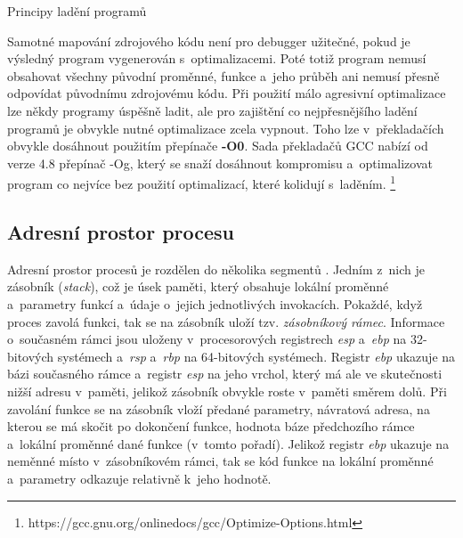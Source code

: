 \documentclass[czech,bachelor,male,python,dept460,hidelinks]{diploma}						%
\newcommand{\parspace}[1][]{
	\ifthenelse{\isempty{#1}}{\vspace{0mm}}{\vspace{#1}}
	\par
}
\begin{document}
\begin{section}{Principy ladění programů}
		\parspace Samotné mapování zdrojového kódu není pro debugger užitečné, pokud je výsledný program vygenerován s~optimalizacemi. Poté
		totiž program nemusí obsahovat všechny původní proměnné, funkce a~jeho průběh ani nemusí přesně odpovídat původnímu zdrojovému kódu.
		Při použití málo agresivní optimalizace lze někdy programy úspěšně ladit, ale pro zajištění co nejpřesnějšího ladění programů je obvykle nutné
		optimalizace zcela vypnout. Toho lze v~překladačích obvykle dosáhnout použitím přepínače \textbf{-O0}. Sada překladačů GCC nabízí od verze 4.8
		přepínač -Og, který se snaží dosáhnout kompromisu a~optimalizovat program co nejvíce bez použití optimalizací, které kolidují s~laděním.
		\footnote{https://gcc.gnu.org/onlinedocs/gcc/Optimize-Options.html}
	
	\subsection{Adresní prostor procesu}
		Adresní prostor procesů je rozdělen do několika segmentů \cite[53]{tanenbaum}. Jedním z~nich je zásobník (\textit{stack}), což je úsek paměti, který
		obsahuje lokální proměnné a~parametry funkcí a~údaje o~jejich jednotlivých invokacích. Pokaždé, když proces zavolá funkci, tak se na zásobník uloží tzv.
		\textit{zásobníkový rámec}. Informace o~současném rámci jsou uloženy v~procesorových registrech \textit{esp} a~\textit{ebp} na 32-bitových systémech
		a~\textit{rsp} a~\textit{rbp} na 64-bitových systémech. Registr \textit{ebp} ukazuje na bázi současného rámce a~registr \textit{esp} na jeho vrchol, který
		má ale ve skutečnosti nižší adresu v~paměti, jelikož zásobník obvykle roste v~paměti směrem dolů. Při zavolání funkce se na zásobník vloží předané parametry,
		návratová adresa, na kterou se má skočit po dokončení funkce, hodnota báze předchozího rámce a~lokální proměnné dané funkce (v~tomto pořadí).
		Jelikož registr \textit{ebp} ukazuje na neměnné místo v~zásobníkovém rámci, tak se kód funkce na lokální proměnné a~parametry odkazuje
		relativně k~jeho hodnotě.
		
		

\end{section}
\end{document}
